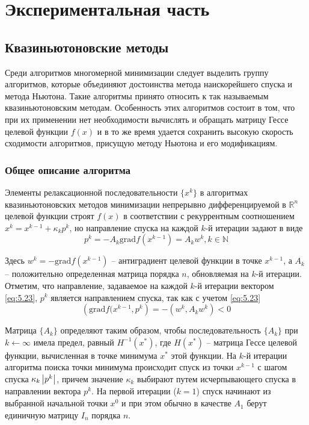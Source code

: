 \chapter{Экспериментальная часть}

\section{Квазиньютоновские методы}

Среди алгоритмов многомерной минимизации следует выделить группу алгоритмов, 
которые объединяют достоинства метода наискорейшего спуска и метода Ньютона. 
Такие алгоритмы принято относить к так называемым квазиньютоновским методам. 
Особенность этих алгоритмов состоит в том, что при их применении нет 
необходимости вычислять и обращать матрицу Гессе целевой функции \( f(x) \) 
и в то же время удается сохранить высокую скорость сходимости алгоритмов, 
присущую методу Ньютона и его модификациям.

\subsection{Общее описание алгоритма}

\newcommand{\grad}{\mathrm{grad}}

Элементы релаксационной последовательности \( \{ x^k \} \) в алгоритмах 
квазиньютоновских методов минимизации непрерывно дифференцируемой в 
\( \mathbb{R}^n \) целевой функции строят \( f(x) \) в соответствии с 
рекуррентным соотношением \( x^k = x^{k-1} + \kappa_k p^k \), но направление 
спуска на каждой \( k \)-й итерации задают в виде
\begin{equation}
    p^k = -A_k \grad f(x^{k-1}) = A_k w^k, k \in \mathbb{N}
    \label{eq:5.23}
\end{equation}

Здесь \( w^k = -\grad f(x^{k-1}) \) -- антиградиент целевой функции в точке 
\( x^{k-1} \), а \( A_k \) -- положительно определенная матрица порядка 
\( n \), обновляемая на \( k \)-й итерации. Отметим, что направление, 
задаваемое на каждой \( k \)-й итерации вектором \eqref{eq:5.23}, \( p^k \) 
является направлением спуска, так как с учетом \eqref{eq:5.23}
\begin{equation}
    \left( \grad f(x^{k-1}, p^k \right) = -\left( w^k, A_k w^k \right) < 0
\end{equation}

Матрица \( \{ A_k \} \) определяют таким образом, чтобы последовательность 
\( \{ A_k \} \) при \( k \leftarrow \infty \) имела предел, равный 
\( H^{-1}(x^*) \), где \( H(x^*) \) -- матрица Гессе целевой функции, 
вычисленная в точке минимума \( x^* \) этой функции. На \( k \)-й итерации 
алгоритма поиска точки минимума происходит спуск из точки \( x^{k-1} \) с 
шагом спуска \( \kappa_k \left| p^k \right| \), причем значение \( \kappa_k \) выбирают 
путем исчерпывающего спуска в направлении вектора \( p^k \). На первой 
итерации (\( k = 1 \)) спуск начинают из выбранной начальной точки \( x^0 \) и 
при этом обычно в качестве \( A_1 \) берут единичную матрицу \( I_n \) порядка 
\( n \). 

